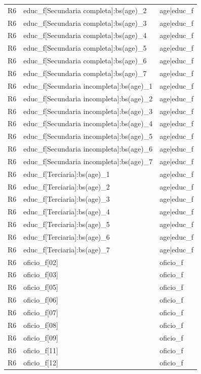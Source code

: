 \begin{longtable}{lll}
R6 & educ\_f[Secundaria completa]:bs(age)\_2 & age|educ\_f \\
R6 & educ\_f[Secundaria completa]:bs(age)\_3 & age|educ\_f \\
R6 & educ\_f[Secundaria completa]:bs(age)\_4 & age|educ\_f \\
R6 & educ\_f[Secundaria completa]:bs(age)\_5 & age|educ\_f \\
R6 & educ\_f[Secundaria completa]:bs(age)\_6 & age|educ\_f \\
R6 & educ\_f[Secundaria completa]:bs(age)\_7 & age|educ\_f \\
R6 & educ\_f[Secundaria incompleta]:bs(age)\_1 & age|educ\_f \\
R6 & educ\_f[Secundaria incompleta]:bs(age)\_2 & age|educ\_f \\
R6 & educ\_f[Secundaria incompleta]:bs(age)\_3 & age|educ\_f \\
R6 & educ\_f[Secundaria incompleta]:bs(age)\_4 & age|educ\_f \\
R6 & educ\_f[Secundaria incompleta]:bs(age)\_5 & age|educ\_f \\
R6 & educ\_f[Secundaria incompleta]:bs(age)\_6 & age|educ\_f \\
R6 & educ\_f[Secundaria incompleta]:bs(age)\_7 & age|educ\_f \\
R6 & educ\_f[Terciaria]:bs(age)\_1 & age|educ\_f \\
R6 & educ\_f[Terciaria]:bs(age)\_2 & age|educ\_f \\
R6 & educ\_f[Terciaria]:bs(age)\_3 & age|educ\_f \\
R6 & educ\_f[Terciaria]:bs(age)\_4 & age|educ\_f \\
R6 & educ\_f[Terciaria]:bs(age)\_5 & age|educ\_f \\
R6 & educ\_f[Terciaria]:bs(age)\_6 & age|educ\_f \\
R6 & educ\_f[Terciaria]:bs(age)\_7 & age|educ\_f \\
R6 & oficio\_f[02] & oficio\_f \\
R6 & oficio\_f[03] & oficio\_f \\
R6 & oficio\_f[05] & oficio\_f \\
R6 & oficio\_f[06] & oficio\_f \\
R6 & oficio\_f[07] & oficio\_f \\
R6 & oficio\_f[08] & oficio\_f \\
R6 & oficio\_f[09] & oficio\_f \\
R6 & oficio\_f[11] & oficio\_f \\
R6 & oficio\_f[12] & oficio\_f \\

\end{longtable}
